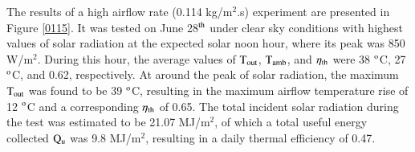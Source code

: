 The results of a high airflow rate (0.114 kg/m$^2$.s) experiment are presented in Figure \ref{0115}. It was tested on June 28$^{\rm{th}}$ under clear sky conditions with highest values of solar radiation at the expected solar noon hour, where its peak was 850 W/m$^2$. During this hour, the average values of $\rm{T_{out}}$, $\rm{T_{amb}}$, and $\eta_{\rm{th}}$ were 38 $^{\rm{o}}$C, 27 $^{\rm{o}}$C, and 0.62, respectively. At around the peak of solar radiation, the maximum $\rm{T_{out}}$ was found to be 39 $^{\rm{o}}$C, resulting in the maximum airflow temperature rise of 12 $^{\rm{o}}$C and a corresponding $\eta_{\rm{th}}$ of 0.65. The total incident solar radiation during the test was estimated to be 21.07 MJ/m$^2$, of which a total useful energy collected $\rm{Q_{u}}$ was 9.8 MJ/m$^2$, resulting in a daily thermal efficiency of 0.47.

